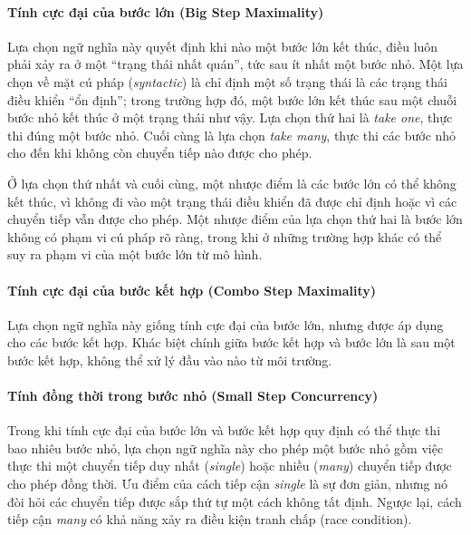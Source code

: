 \paragraph{Tính cực đại của bước lớn (Big Step Maximality)}
Lựa chọn ngữ nghĩa này quyết định khi nào một bước lớn kết thúc, điều luôn phải xảy ra ở một ``trạng thái nhất quán'', tức sau ít nhất một bước nhỏ. Một lựa chọn về mặt cú pháp (\emph{syntactic}) là chỉ định một số trạng thái là các trạng thái điều khiển ``ổn định''; trong trường hợp đó, một bước lớn kết thúc sau một chuỗi bước nhỏ kết thúc ở một trạng thái như vậy. Lựa chọn thứ hai là \emph{take one}, thực thi đúng một bước nhỏ. Cuối cùng là lựa chọn \emph{take many}, thực thi các bước nhỏ cho đến khi không còn chuyển tiếp nào được cho phép.

Ở lựa chọn thứ nhất và cuối cùng, một nhược điểm là các bước lớn có thể không kết thúc, vì không đi vào một trạng thái điều khiển đã được chỉ định hoặc vì các chuyển tiếp vẫn được cho phép. Một nhược điểm của lựa chọn thứ hai là bước lớn không có phạm vi cú pháp rõ ràng, trong khi ở những trường hợp khác có thể suy ra phạm vi của một bước lớn từ mô hình.

\paragraph{Tính cực đại của bước kết hợp (Combo Step Maximality)}
Lựa chọn ngữ nghĩa này giống tính cực đại của bước lớn, nhưng được áp dụng cho các bước kết hợp. Khác biệt chính giữa bước kết hợp và bước lớn là sau một bước kết hợp, không thể xử lý đầu vào nào từ môi trường.

\paragraph{Tính đồng thời trong bước nhỏ (Small Step Concurrency)}
Trong khi tính cực đại của bước lớn và bước kết hợp quy định có thể thực thi bao nhiêu bước nhỏ, lựa chọn ngữ nghĩa này cho phép một bước nhỏ gồm việc thực thi một chuyển tiếp duy nhất (\emph{single}) hoặc nhiều (\emph{many}) chuyển tiếp được cho phép đồng thời. Ưu điểm của cách tiếp cận \emph{single} là sự đơn giản, nhưng nó đòi hỏi các chuyển tiếp được sắp thứ tự một cách không tất định. Ngược lại, cách tiếp cận \emph{many} có khả năng xảy ra điều kiện tranh chấp (race condition).

